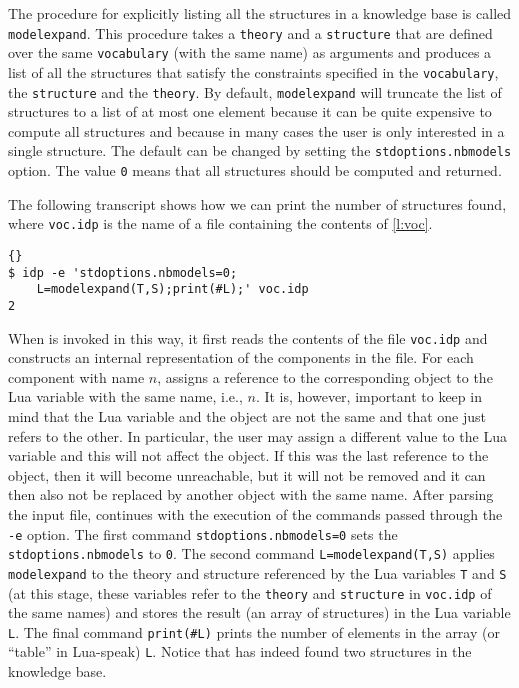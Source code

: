 \documentclass{article}
\begin{document}
The procedure for explicitly listing all the structures
in a knowledge base is called \lstinline{modelexpand}.
This procedure takes a \texttt{theory} and a \texttt{structure}
that are defined over the same \texttt{vocabulary} (with the same name)
as arguments
and produces a list of all the structures that satisfy the
constraints specified in the \texttt{vocabulary}, the \texttt{structure}
and the \texttt{theory}.
By default, \lstinline{modelexpand} will truncate the list
of structures to a list of at most one element because it can
be quite expensive to compute all structures and because in many
cases the user is only interested in a single structure.
The default can be changed by setting the
\lstinline{stdoptions.nbmodels} option.  The value \lstinline{0}
means that all structures should be computed and returned.

The following transcript shows how we can print the number
of structures found, where \texttt{voc.idp} is the name of a file
containing the contents of \autoref{l:voc}.
\begin{lstlisting}{}
$ idp -e 'stdoptions.nbmodels=0;
    L=modelexpand(T,S);print(#L);' voc.idp 
2
\end{lstlisting}
When \idp is invoked in this way, it
first reads the contents of the file \texttt{voc.idp}
and constructs an internal representation of the components in the file.
For each component with name $n$, \idp assigns a reference to the
corresponding object to the Lua variable with the same name, i.e., $n$.
It is, however, important to keep in mind that the Lua variable
and the object are not the same and that one just refers to the other.
In particular, the user may assign a different value to the Lua
variable and this will not affect the object.  If this was the last
reference to the object, then it will become unreachable, but it will
not be removed and it can then also not be replaced by another object
with the same name.
After parsing the input file, \idp continues with the execution of
the commands passed through the \lstinline{-e} option.
The first command \lstinline{stdoptions.nbmodels=0} sets
the \lstinline{stdoptions.nbmodels} to \lstinline{0}.
The second command \lstinline{L=modelexpand(T,S)} applies
\lstinline{modelexpand} to the theory and structure referenced
by the Lua variables \lstinline{T} and \lstinline{S} (at this stage,
these variables refer to the \lstinline{theory} and \lstinline{structure}
in \lstinline{voc.idp} of the same names) and stores the result
(an array of structures) in the Lua variable \lstinline{L}.
The final command \lstinline{print(#L)} prints the number of elements
in the array (or ``table'' in Lua-speak) \lstinline{L}.
Notice that \idp has indeed found two structures in the knowledge base.
\end{document}
